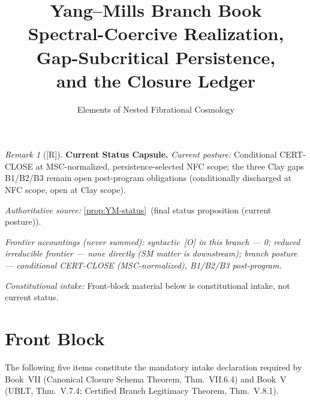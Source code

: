 \documentclass[12pt,oneside]{amsbook}
\theoremstyle{plain}
\theoremstyle{definition}
\theoremstyle{remark}
\newtheorem{remark}[theorem]{Remark}
\newcommand{\status}[1]{\textup{[#1]}}
\begin{document}
\title{Yang--Mills Branch Book\\[6pt]
 Spectral-Coercive Realization, Gap-Subcritical Persistence,\\
 and the Closure Ledger}
\author{Elements of Nested Fibrational Cosmology}
\date{}
\maketitle

\tableofcontents

\bigskip


\begin{remark}[\status{R}]\label{cap:YM-status}
\textbf{Current Status Capsule.}
\emph{Current posture:} Conditional CERT-CLOSE at MSC-normalized, persistence-selected NFC scope; the three Clay gaps B1/B2/B3 remain open post-program obligations (conditionally discharged at NFC scope, open at Clay scope).

\emph{Authoritative source:} \ref{prop:YM-status}~(final status proposition (current posture)).

\emph{Frontier accountings (never summed): syntactic~[O] in this branch --- 0; reduced irreducible frontier --- none directly (SM matter is downstream); branch posture --- conditional CERT-CLOSE (MSC-normalized), B1/B2/B3 post-program.}

\emph{Constitutional intake:} Front-block material below is constitutional intake, not current status.
\end{remark}

\section*{Front Block}

The following five items constitute the mandatory intake declaration
required by Book~VII (Canonical Closure Schema Theorem, Thm.~VII.6.4)
and Book~V (UBLT, Thm.~V.7.4; Certified Branch Legitimacy Theorem,
Thm.~V.8.1).
\end{document}

